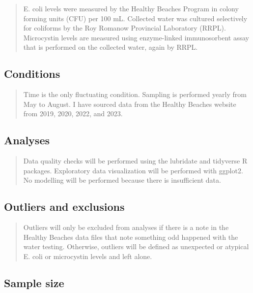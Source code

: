 \documentclass[]{article}
\begin{document}
\begin{quote}
E. coli levels were measured by the Healthy Beaches Program in colony
forming units (CFU) per 100 mL. Collected water was cultured selectively
for coliforms by the Roy Romanow Provincial Laboratory (RRPL).
Microcystin levels are measured using enzyme-linked immunosorbent assay
that is performed on the collected water, again by RRPL.
\end{quote}

\hypertarget{conditions}{%
\subsection{Conditions}\label{conditions}}

\begin{quote}
Time is the only fluctuating condition. Sampling is performed yearly
from May to August. I have sourced data from the Healthy Beaches website
from 2019, 2020, 2022, and 2023.
\end{quote}

\hypertarget{analyses}{%
\subsection{Analyses}\label{analyses}}

\begin{quote}
Data quality checks will be performed using the lubridate and tidyverse
R packages. Exploratory data visualization will be performed with
ggplot2. No modelling will be performed because there is insufficient
data.
\end{quote}

\hypertarget{outliers-and-exclusions}{%
\subsection{Outliers and exclusions}\label{outliers-and-exclusions}}

\begin{quote}
Outliers will only be excluded from analyses if there is a note in the
Healthy Beaches data files that note something odd happened with the
water testing. Otherwise, outliers will be defined as unexpected or
atypical E. coli or microcystin levels and left alone.
\end{quote}

\hypertarget{sample-size}{%
\subsection{Sample size}\label{sample-size}}
\end{document}
